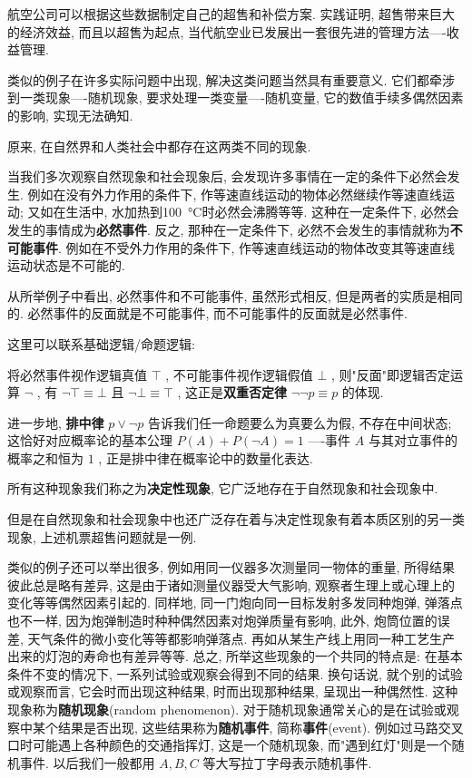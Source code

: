 \documentclass[../../main.tex]{subfiles}
\begin{document}
航空公司可以根据这些数据制定自己的超售和补偿方案. 实践证明, 超售带来巨大的经济效益, 而且以超售为起点, 当代航空业已发展出一套很先进的管理方法----收益管理. 

类似的例子在许多实际问题中出现, 解决这类问题当然具有重要意义. 它们都牵涉到一类现象----随机现象, 要求处理一类变量----随机变量, 它的数值手续多偶然因素的影响, 实现无法确知. 

原来, 在自然界和人类社会中都存在这两类不同的现象. 

当我们多次观察自然现象和社会现象后, 会发现许多事情在一定的条件下必然会发生. 例如在没有外力作用的条件下, 作等速直线运动的物体必然继续作等速直线运动; 又如在生活中, 水加热到\SI{100}{\celsius}时必然会沸腾等等. 这种在一定条件下, 必然会发生的事情成为\textbf{必然事件}. 反之, 那种在一定条件下, 必然不会发生的事情就称为\textbf{不可能事件}. 例如在不受外力作用的条件下, 作等速直线运动的物体改变其等速直线运动状态是不可能的. 

从所举例子中看出, 必然事件和不可能事件, 虽然形式相反, 但是两者的实质是相同的. 必然事件的反面就是不可能事件, 而不可能事件的反面就是必然事件. 
\begin{myquote}
    这里可以联系基础逻辑/命题逻辑: 

    将必然事件视作逻辑真值 $\top$ , 不可能事件视作逻辑假值 $\bot$ , 则"反面"即逻辑否定运算 $\lnot$ , 有 $\lnot\top\equiv\bot$ 且 $\lnot\bot\equiv\top$ , 这正是\textbf{双重否定律} $\lnot\lnot p\equiv p$ 的体现. 

    进一步地, \textbf{排中律} $p\lor\lnot p$ 告诉我们任一命题要么为真要么为假, 不存在中间状态; 这恰好对应概率论的基本公理 $P(A)+P(\lnot A)=1$ ----事件 $A$ 与其对立事件的概率之和恒为 $1$ , 正是排中律在概率论中的数量化表达. 
\end{myquote}

所有这种现象我们称之为\textbf{决定性现象}, 它广泛地存在于自然现象和社会现象中. 

但是在自然现象和社会现象中也还广泛存在着与决定性现象有着本质区别的另一类现象, 上述机票超售问题就是一例. 

类似的例子还可以举出很多, 例如用同一仪器多次测量同一物体的重量, 所得结果彼此总是略有差异, 这是由于诸如测量仪器受大气影响, 观察者生理上或心理上的变化等等偶然因素引起的. 同样地, 同一门炮向同一目标发射多发同种炮弹, 弹落点也不一样, 因为炮弹制造时种种偶然因素对炮弹质量有影响, 此外, 炮筒位置的误差, 天气条件的微小变化等等都影响弹落点. 再如从某生产线上用同一种工艺生产出来的灯泡的寿命也有差异等等. 总之, 所举这些现象的一个共同的特点是: 在基本条件不变的情况下, 一系列试验或观察会得到不同的结果. 换句话说, 就个别的试验或观察而言, 它会时而出现这种结果, 时而出现那种结果, 呈现出一种偶然性. 这种现象称为\textbf{随机现象}(random phenomenon). 对于随机现象通常关心的是在试验或观察中某个结果是否出现, 这些结果称为\textbf{随机事件}, 简称\textbf{事件}(event). 例如过马路交叉口时可能遇上各种颜色的交通指挥灯, 这是一个随机现象, 而"遇到红灯"则是一个随机事件. 以后我们一般都用 $A, B, C$ 等大写拉丁字母表示随机事件. 
\end{document}
